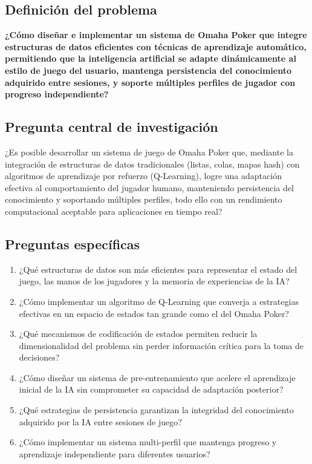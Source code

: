 \documentclass[12pt,a4paper]{article}
\begin{document}
\subsection{Definición del problema}

\textbf{¿Cómo diseñar e implementar un sistema de Omaha Poker que integre estructuras de datos eficientes con técnicas de aprendizaje automático, permitiendo que la inteligencia artificial se adapte dinámicamente al estilo de juego del usuario, mantenga persistencia del conocimiento adquirido entre sesiones, y soporte múltiples perfiles de jugador con progreso independiente?}

\subsection{Pregunta central de investigación}

¿Es posible desarrollar un sistema de juego de Omaha Poker que, mediante la integración de estructuras de datos tradicionales (listas, colas, mapas hash) con algoritmos de aprendizaje por refuerzo (Q-Learning), logre una adaptación efectiva al comportamiento del jugador humano, manteniendo persistencia del conocimiento y soportando múltiples perfiles, todo ello con un rendimiento computacional aceptable para aplicaciones en tiempo real?

\subsection{Preguntas específicas}

\begin{enumerate}
    \item ¿Qué estructuras de datos son más eficientes para representar el estado del juego, las manos de los jugadores y la memoria de experiencias de la IA?
    
    \item ¿Cómo implementar un algoritmo de Q-Learning que converja a estrategias efectivas en un espacio de estados tan grande como el del Omaha Poker?
    
    \item ¿Qué mecanismos de codificación de estados permiten reducir la dimensionalidad del problema sin perder información crítica para la toma de decisiones?
    
    \item ¿Cómo diseñar un sistema de pre-entrenamiento que acelere el aprendizaje inicial de la IA sin comprometer su capacidad de adaptación posterior?
    
    \item ¿Qué estrategias de persistencia garantizan la integridad del conocimiento adquirido por la IA entre sesiones de juego?
    
    \item ¿Cómo implementar un sistema multi-perfil que mantenga progreso y aprendizaje independiente para diferentes usuarios?
\end{enumerate}
\end{document}
